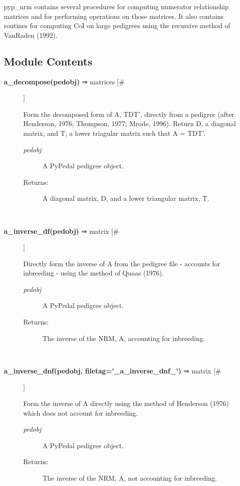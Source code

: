 \par pyp\_nrm contains several procedures for computing numerator relationship matrices and for
performing operations on those matrices.  It also contains routines for computing CoI on
large pedigrees using the recursive method of VanRaden (1992).
\subsection*{Module Contents}
\begin{description}
\item[\textbf{a\_decompose(pedobj)} ⇒ matrices [\#]
]
\par Form the decomposed form of A, TDT', directly from a pedigree (after
Henderson, 1976; Thompson, 1977; Mrode, 1996).  Return D, a diagonal
matrix, and T, a lower triagular matrix such that A = TDT'.
\begin{description}
\item[\textit{pedobj}
]
A PyPedal pedigree object.
\item[Returns:
]
A diagonal matrix, D, and a lower triangular matrix, T.
\end{description}\\

\item[\textbf{a\_inverse\_df(pedobj)} ⇒ matrix [\#]
]
\par Directly form the inverse of A from the pedigree file - accounts for
inbreeding - using the method of Quaas (1976).
\begin{description}
\item[\textit{pedobj}
]
A PyPedal pedigree object.
\item[Returns:
]
The inverse of the NRM, A, accounting for inbreeding.
\end{description}\\

\item[\textbf{a\_inverse\_dnf(pedobj, filetag='\_a\_inverse\_dnf\_')} ⇒ matrix [\#]
]
\par Form the inverse of A directly using the method of Henderson (1976) which
does not account for inbreeding.
\begin{description}
\item[\textit{pedobj}
]
A PyPedal pedigree object.
\item[Returns:
]
The inverse of the NRM, A, not accounting for inbreeding.
\end{description}\\


\end{description}
